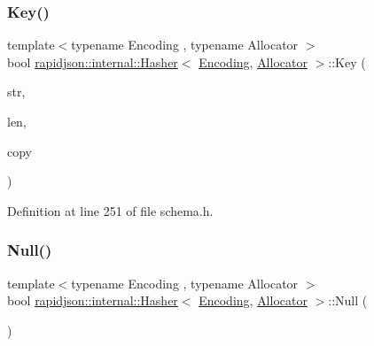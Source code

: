 \subsubsection{\texorpdfstring{Key()}{Key()}}
{\footnotesize\ttfamily template$<$typename Encoding , typename Allocator $>$ \\
bool \mbox{\hyperlink{classrapidjson_1_1internal_1_1_hasher}{rapidjson\+::internal\+::\+Hasher}}$<$ \mbox{\hyperlink{classrapidjson_1_1_encoding}{Encoding}}, \mbox{\hyperlink{classrapidjson_1_1_allocator}{Allocator}} $>$\+::Key (\begin{DoxyParamCaption}\item[{const \mbox{\hyperlink{classrapidjson_1_1internal_1_1_hasher_ae583d393fe48a90f9369f1fb5e488ab9}{Ch}} $\ast$}]{str,  }\item[{\mbox{\hyperlink{namespacerapidjson_a44eb33eaa523e36d466b1ced64b85c84}{Size\+Type}}}]{len,  }\item[{bool}]{copy }\end{DoxyParamCaption})}



Definition at line 251 of file schema.\+h.


\begin{DoxyCode}{0}

\end{DoxyCode}
\mbox{\label{classrapidjson_1_1internal_1_1_hasher_a94b14e578a8a6a531f13b17dc57e96c6}} 
\subsubsection{\texorpdfstring{Null()}{Null()}}
{\footnotesize\ttfamily template$<$typename Encoding , typename Allocator $>$ \\
bool \mbox{\hyperlink{classrapidjson_1_1internal_1_1_hasher}{rapidjson\+::internal\+::\+Hasher}}$<$ \mbox{\hyperlink{classrapidjson_1_1_encoding}{Encoding}}, \mbox{\hyperlink{classrapidjson_1_1_allocator}{Allocator}} $>$\+::Null (\begin{DoxyParamCaption}{ }\end{DoxyParamCaption})}



